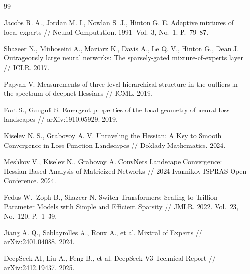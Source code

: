 \documentclass[11pt]{extarticle}
\theoremstyle{definition}
\theoremstyle{plain}
\theoremstyle{remark}
\begin{document}
\begin{thebibliography}{99}

Jacobs R. A., Jordan M. I., Nowlan S. J., Hinton G. E.
Adaptive mixtures of local experts // Neural Computation. 1991. Vol.~3, No.~1. P.~79--87.

Shazeer N., Mirhoseini A., Maziarz K., Davis A., Le Q. V., Hinton G., Dean J.
Outrageously large neural networks: The sparsely-gated mixture-of-experts layer // ICLR. 2017.

Papyan V.
Measurements of three-level hierarchical structure in the outliers in the spectrum of deepnet Hessians // ICML. 2019.

Fort S., Ganguli S.
Emergent properties of the local geometry of neural loss landscapes // arXiv:1910.05929. 2019.

Kiselev N. S., Grabovoy A. V.
Unraveling the Hessian: A Key to Smooth Convergence in Loss Function Landscapes // Doklady Mathematics. 2024.

Meshkov V., Kiselev N., Grabovoy A.
ConvNets Landscape Convergence: Hessian-Based Analysis of Matricized Networks // 2024 Ivannikov ISPRAS Open Conference. 2024.

Fedus W., Zoph B., Shazeer N.
Switch Transformers: Scaling to Trillion Parameter Models with Simple and Efficient Sparsity //
JMLR. 2022. Vol.~23, No.~120. P.~1--39.

Jiang A. Q., Sablayrolles A., Roux A., et al.
Mixtral of Experts // arXiv:2401.04088. 2024.

DeepSeek-AI, Liu A., Feng B., et al.
DeepSeek-V3 Technical Report // arXiv:2412.19437. 2025.

\end{thebibliography}


\end{document}
